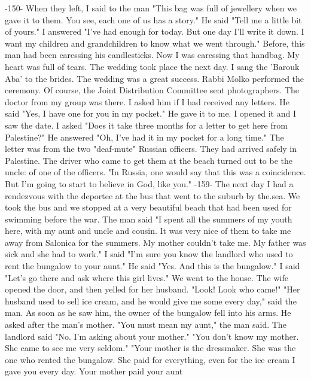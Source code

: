 
-150- 
When they left, I said to the man "This bag was full of jewellery when we gave it 
to them.
You see, each one of us has a story."
He said "Tell me a little bit of yours."
I answered "I've had enough for today.
But one day I'll write it down.
I want my 
children and  grandchildren to know what we went through."
Before, this man had been 
caressing his candlesticks.
Now I was caressing that handbag.
My heart was full of 
tears.
The wedding took place the next day.
I sang the 'Barouk Aba' to the brides.
The 
wedding was a great success.
Rabbi Molko performed the ceremony.
Of course, the Joint 
Distribution Committee sent photographers.
The doctor from my group was there.
I asked him if I had received any letters.
He 
said "Yes, I have one for you in my pocket."
He gave it to me.
I opened it and I saw 
the date.
I asked "Does it take three months for a letter to get here from Palestine?"
He answered "Oh, I've had it in my pocket for a long time."
The letter was from the two "deaf-mute" Russian officers.
They had arrived safely 
in Palestine.
The driver who came to get them at the beach turned out to be the uncle: 
of one of the officers.
"In Russia, one would say that this was a coincidence.
But 
I'm going to start to believe in God, like you."
-159- 
The next day I had a rendezvous with the deportee at the bus that went to the suburb by the.sea.
We took the bus and we stopped at a very beautiful beach that had been 
used for swimming before the war.
The man said "I spent all the summers of my youth 
here, with my aunt and uncle and cousin.
It was very nice of them to take me away from 
Salonica for the summers.
My mother couldn't take me.
My father was sick and she had to 
work."
I said "I'm sure you know the landlord who used to rent the bungalow to your aunt."
He said "Yes.
And this is the bungalow."
I said "Let's go there and ask where this girl lives."
We went to the house.
The wife opened the door, and then yelled for her husband.
"Look!
Look who came!"
"Her husband used to sell ice cream, and he would give me some every day," said the 
man.
As soon as he saw him, the owner of the bungalow fell into his arms.
He 
asked after the man's mother.
"You must mean my aunt," the man said.
The landlord said "No.
I'm asking about your mother."
"You don't know my mother.
She came to see me very seldom."
"Your mother is the dressmaker.
She was the one who rented the bungalow.
She paid 
for everything, even for the ice cream I gave you every day.
Your mother paid your aunt 
